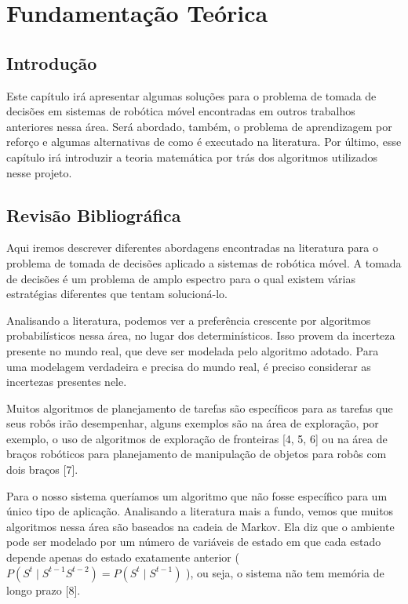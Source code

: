 
\chapter{Fundamentação Teórica} \label{chap:FundamentacaoMatematica}



\section{Introdução}

Este capítulo irá apresentar algumas soluções para o problema de tomada de decisões em sistemas de robótica móvel encontradas em outros trabalhos anteriores nessa área. Será abordado, também, o problema de aprendizagem por reforço e algumas alternativas de como é executado na literatura. Por último, esse capítulo irá introduzir a teoria matemática por trás dos algoritmos utilizados nesse projeto.


\section{Revisão Bibliográfica} \label{section:RevisaoBibliografica}

Aqui iremos descrever diferentes abordagens encontradas na literatura para o problema de tomada de decisões aplicado a sistemas de robótica móvel. A tomada de decisões é um problema de amplo espectro para o qual existem várias estratégias diferentes que tentam solucioná-lo.

Analisando a literatura, podemos ver a preferência crescente por algoritmos probabilísticos nessa área, no lugar dos determinísticos. Isso provem da incerteza presente no mundo real, que deve ser modelada pelo algoritmo adotado. Para uma modelagem verdadeira e precisa do mundo real, é preciso considerar as incertezas presentes nele.

Muitos algoritmos de planejamento de tarefas são específicos para as tarefas que seus robôs irão desempenhar, alguns exemplos são na área de exploração, por exemplo, o uso de algoritmos de exploração de fronteiras [4, 5, 6] ou na área de braços robóticos para planejamento de manipulação de objetos para robôs com dois braços [7].

Para o nosso sistema queríamos um algoritmo que não fosse específico para um único tipo de aplicação. Analisando a literatura mais a fundo, vemos que muitos algoritmos nessa área são baseados na cadeia de Markov. Ela diz que o ambiente pode ser modelado por um número de variáveis de estado em que cada estado depende apenas do estado exatamente anterior ( $ P(S^t\mid S^{t-1}S^{t-2})=P(S^t\mid S^{t-1}) $ ), ou seja, o sistema não tem memória de longo prazo [8].

